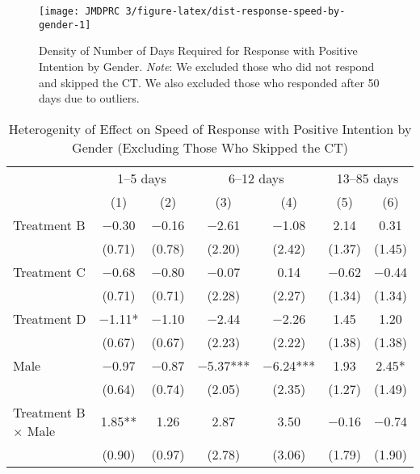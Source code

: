 \documentclass[12pt, a4paper]{article}
\begin{document}
\begin{figure}[H]
\texttt{[image: JMDPRC~3/figure-latex/dist-response-speed-by-gender-1]} \caption{Density of Number of Days Required for Response with Positive Intention by Gender. \newline \emph{Note}: We excluded those who did not respond and skipped the CT. We also excluded those who responded after 50 days due to outliers.}\label{fig:dist-response-speed-by-gender}
\end{figure}

\begin{table}[H]

\caption{\label{tab:lm-interaction-gender-int-time-decompose-noskip}Heterogenity of Effect on Speed of Response with Positive Intention by Gender (Excluding Those Who Skipped the CT)}
\centering
\fontsize{8}{10}\selectfont
\begin{threeparttable}
\begin{tabular}[t]{lcccccc}
\toprule
\multicolumn{1}{c}{ } & \multicolumn{2}{c}{1--5 days} & \multicolumn{2}{c}{6--12 days} & \multicolumn{2}{c}{13--85 days} \\
\cmidrule(l{3pt}r{3pt}){2-3} \cmidrule(l{3pt}r{3pt}){4-5} \cmidrule(l{3pt}r{3pt}){6-7}
  & (1) & (2) & (3) & (4) & (5) & (6)\\
\midrule
Treatment B & \num{-0.30} & \num{-0.16} & \num{-2.61} & \num{-1.08} & \num{2.14} & \num{0.31}\\
 & (\num{0.71}) & (\num{0.78}) & (\num{2.20}) & (\num{2.42}) & (\num{1.37}) & (\num{1.45})\\
Treatment C & \num{-0.68} & \num{-0.80} & \num{-0.07} & \num{0.14} & \num{-0.62} & \num{-0.44}\\
 & (\num{0.71}) & (\num{0.71}) & (\num{2.28}) & (\num{2.27}) & (\num{1.34}) & (\num{1.34})\\
Treatment D & \num{-1.11}* & \num{-1.10} & \num{-2.44} & \num{-2.26} & \num{1.45} & \num{1.20}\\
 & (\num{0.67}) & (\num{0.67}) & (\num{2.23}) & (\num{2.22}) & (\num{1.38}) & (\num{1.38})\\
Male & \num{-0.97} & \num{-0.87} & \num{-5.37}*** & \num{-6.24}*** & \num{1.93} & \num{2.45}*\\
 & (\num{0.64}) & (\num{0.74}) & (\num{2.05}) & (\num{2.35}) & (\num{1.27}) & (\num{1.49})\\
Treatment B $\times$ Male & \num{1.85}** & \num{1.26} & \num{2.87} & \num{3.50} & \num{-0.16} & \num{-0.74}\\
 & (\num{0.90}) & (\num{0.97}) & (\num{2.78}) & (\num{3.06}) & (\num{1.79}) & (\num{1.90})\\

\end{tabular}
\end{threeparttable}
\end{table}
\end{document}
